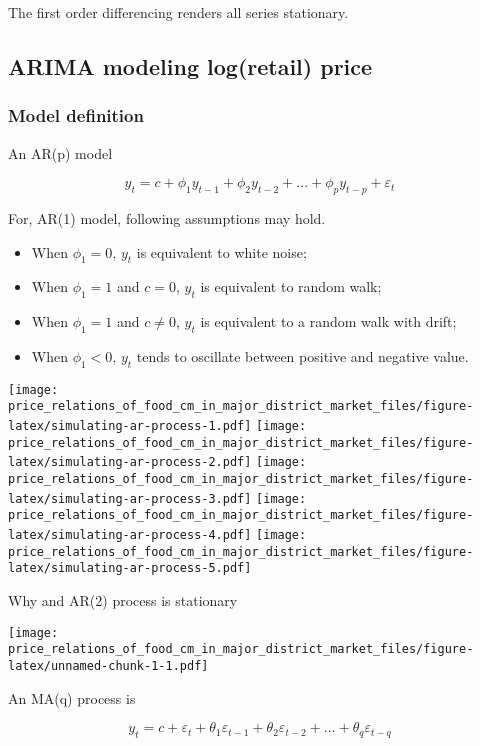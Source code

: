 \documentclass[12pt,]{article}
\providecommand{\tightlist}{%
  \setlength{\itemsep}{0pt}\setlength{\parskip}{0pt}}
\begin{document}
The first order differencing renders all series stationary.

\hypertarget{arima-modeling-logretail-price}{%
\subsection{ARIMA modeling log(retail) price}\label{arima-modeling-logretail-price}}

\hypertarget{model-definition}{%
\subsubsection{Model definition}\label{model-definition}}

An AR(p) model

\[
y_t = c + \phi_1 y_{t-1} + \phi_2 y_{t-2} + ... + \phi_p y_{t - p} + \varepsilon_t
\]

For, AR(1) model, following assumptions may hold.

\begin{itemize}
\tightlist
\item
  When \(\phi_1 = 0\), \(y_t\) is equivalent to white noise;
\item
  When \(\phi_1 = 1\) and \(c = 0\), \(y_t\) is equivalent to random walk;
\item
  When \(\phi_1 = 1\) and \(c \neq 0\), \(y_t\) is equivalent to a random walk with drift;
\item
  When \(\phi_1 < 0\), \(y_t\) tends to oscillate between positive and negative value.
\end{itemize}

\texttt{[image: price\_relations\_of\_food\_cm\_in\_major\_district\_market\_files/figure-latex/simulating-ar-process-1.pdf]} \texttt{[image: price\_relations\_of\_food\_cm\_in\_major\_district\_market\_files/figure-latex/simulating-ar-process-2.pdf]} \texttt{[image: price\_relations\_of\_food\_cm\_in\_major\_district\_market\_files/figure-latex/simulating-ar-process-3.pdf]} \texttt{[image: price\_relations\_of\_food\_cm\_in\_major\_district\_market\_files/figure-latex/simulating-ar-process-4.pdf]} \texttt{[image: price\_relations\_of\_food\_cm\_in\_major\_district\_market\_files/figure-latex/simulating-ar-process-5.pdf]}

Why and AR(2) process is stationary

\texttt{[image: price\_relations\_of\_food\_cm\_in\_major\_district\_market\_files/figure-latex/unnamed-chunk-1-1.pdf]}

An MA(q) process is

\[
y_t = c + \varepsilon_t + \theta_1 \varepsilon_{t-1} + \theta_2 \varepsilon_{t-2} + ... + \theta_q \varepsilon_{t-q}
\]
\end{document}
